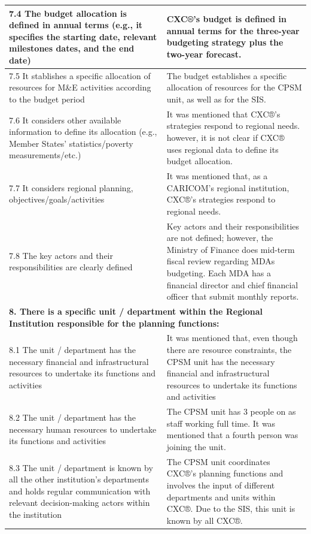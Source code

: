 \documentclass[
  10pt,
]{book}
\begin{document}
\begin{table}
\begin{tabular}[t]{l|l}
\hline
\hspace{1em}7.4 The budget allocation is defined in annual terms (e.g., it specifies the starting date, relevant milestones dates, and the end date) & CXC®’s budget is defined in annual terms for the three-year budgeting strategy plus the two-year forecast.\\
\hline
\hspace{1em}7.5 It stablishes a specific allocation of resources for M\&E activities according to the budget period & The budget establishes a specific allocation of resources for the CPSM unit, as well as for the SIS.\\
\hline
\hspace{1em}7.6 It considers other available information to define its allocation (e.g., Member States’ statistics/poverty measurements/etc.) & It was mentioned that CXC®’s strategies respond to regional needs. however, it is not clear if CXC® uses regional data to define its budget allocation.\\
\hline
\hspace{1em}7.7 It considers regional planning, objectives/goals/activities & It was mentioned that, as a CARICOM’s regional institution, CXC®’s strategies respond to regional needs.\\
\hline
\hspace{1em}7.8 The key actors and their responsibilities are clearly defined & Key actors and their responsibilities are not defined; however, the Ministry of Finance does mid-term fiscal review regarding MDAs budgeting. Each MDA has a financial director and chief financial officer that submit monthly reports.\\
\hline
\multicolumn{2}{l}{\textbf{8. There is a specific unit / department within the Regional Institution responsible for the planning functions:}}\\
\hline
\hspace{1em}8.1 The unit / department has the necessary financial and infrastructural resources to undertake its functions and activities & It was mentioned that, even though there are resource constraints, the CPSM unit has the  necessary financial and infrastructural resources to undertake its functions and activities\\
\hline
\hspace{1em}8.2 The unit / department has the necessary human resources to undertake its functions and activities & The CPSM unit has 3 people on as staff working full time. It was mentioned that a fourth person was joining the unit.\\
\hline
\hspace{1em}8.3 The unit / department is known by all the other institution's departments and holds regular communication with relevant decision-making actors within the institution & The CPSM unit coordinates CXC®’s planning functions and involves the input of different departments and units within CXC®. Due to the SIS, this unit is known by all CXC®.\\
\hline
\end{tabular}
\end{table}
\end{document}
